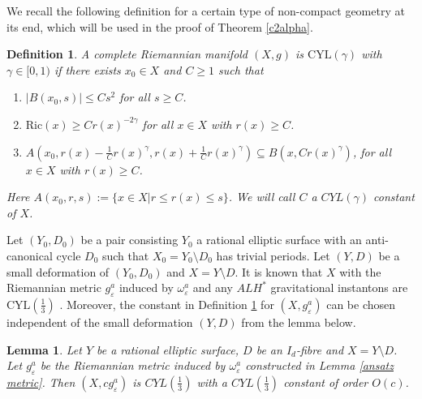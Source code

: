 \documentclass[11pt]{amsart}
\theoremstyle{plain}
\newtheorem{defn}[thm]{Definition}
\newtheorem{lem}[thm]{Lemma}
\theoremstyle{definition}
\numberwithin{equation}{section}
\renewcommand{\leq}{\leqslant}
\renewcommand{\geq}{\geqslant}
\renewcommand{\epsilon}{\varepsilon}
\begin{document}
We recall the following definition for a certain type of non-compact geometry at its end, which will be used in the proof of Theorem \ref{c2alpha}.  
\begin{defn}\label{CYL}
	A complete Riemannian manifold $(X,g)$ is $\mbox{CYL}(\gamma)$ with $\gamma\in [0,1)$ if there exists $x_0\in X$ and $C\geq 1$ such that
	\begin{enumerate}
		\item  $|B(x_0,s)|\leq Cs^2$ for all $s\geq C$.
		\item  $\mbox{Ric}(x)\geq Cr(x)^{-2\gamma}$ for all $x\in X$ with $r(x)\geq C$.
		\item $A(x_0, r(x)-\frac{1}{C}r(x)^{\gamma}, r(x)+\frac{1}{C}r(x)^{\gamma})\subseteq B(x,Cr(x)^{\gamma})$, for all $x\in X$ with $r(x)\geq C$.
	\end{enumerate}
Here $A( x_0,r, s):=\Big\{x\in X\Big|r\leq r(x)\leq s \Big\}$. We will call $C$ a $CYL(\gamma)$ constant of $X$. 
\end{defn}
 Let $(Y_0,D_0)$ be a pair consisting $Y_0$ a rational elliptic surface with an anti-canonical cycle $D_0$ such that $X_0=Y_0\setminus D_0$ has trivial periods. Let $(Y,D)$ be a small deformation of $(Y_0,D_0)$ and $X=Y\setminus D$. 
	It is known that $X$ with the Riemannian metric $g^a_{\epsilon}$ induced by $\omega_{\epsilon}^a$ and any $ALH^*$ gravitational instantons are $\mbox{CYL}(\frac{1}{3})$ \cite[p. 379]{Hein}. Moreover, the constant in Definition \ref{CYL} for $(X,g^a_{\epsilon})$ can be chosen independent of the small deformation $(Y,D)$ from the lemma below.
\begin{lem}
	Let $Y$ be a rational elliptic surface, $D$ be an $I_d$-fibre and $X=Y\setminus D$. Let $g_{\epsilon}^a$ be the Riemannian metric induced by $\omega^{a}_{\epsilon}$ constructed in Lemma \ref{ansatz metric}. Then $(X,cg^a_{\epsilon})$ is $CYL(\frac{1}{3})$ with a $CYL(\frac{1}{3})$ constant of order $O(c)$. 
\end{lem}
\end{document}
